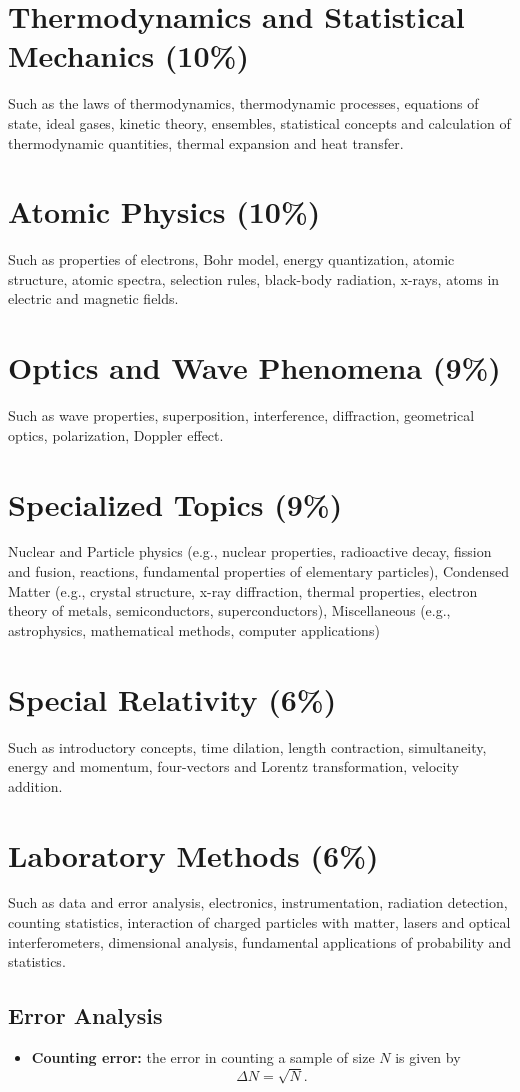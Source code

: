 \documentclass[%
 reprint,
superscriptaddress,
 amsmath,amssymb,
 aps,
prc,
]{revtex4-1}
\begin{document}
\section{Thermodynamics and Statistical Mechanics (10\%)}
Such as the laws of thermodynamics, thermodynamic processes, equations of state, ideal gases, kinetic theory, ensembles, statistical concepts and calculation of thermodynamic quantities, thermal expansion and heat transfer.

\section{Atomic Physics (10\%)}
Such as properties of electrons, Bohr model, energy quantization, atomic structure, atomic spectra, selection rules, black-body radiation, x-rays, atoms in electric and magnetic fields.

\section{Optics and Wave Phenomena (9\%)}
Such as wave properties, superposition, interference, diffraction, geometrical optics, polarization, Doppler effect.

\section{Specialized Topics (9\%)}
Nuclear and Particle physics (e.g., nuclear properties, radioactive decay, fission and fusion, reactions, fundamental properties of elementary particles), Condensed Matter (e.g., crystal structure, x-ray diffraction, thermal properties, electron theory of metals, semiconductors, superconductors), Miscellaneous (e.g., astrophysics, mathematical methods, computer applications)

\section{Special Relativity (6\%)}
Such as introductory concepts, time dilation, length contraction, simultaneity, energy and momentum, four-vectors and Lorentz transformation, velocity addition.

\section{Laboratory Methods (6\%)}
Such as data and error analysis, electronics, instrumentation, radiation detection, counting statistics, interaction of charged particles with matter, lasers and optical interferometers, dimensional analysis, fundamental applications of probability and statistics.

\subsection{Error Analysis}
\begin{itemize}
	\item \textbf{Counting error:} the error in counting a sample of size $N$ is given by
	\begin{equation}
		\Delta N = \sqrt{N}.
	\end{equation}
\end{itemize}
\end{document}
